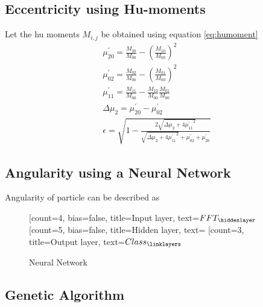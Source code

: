 \documentclass[11pt,fleqn,,a4paper,twoside,openright]{book}
\begin{document}
\subsection{Eccentricity using Hu-moments} \label{HuMoments}

\begin{sBox}
	Let the hu moments $ M_{i,j} $ be obtained using equation \ref{eq:humoment}
	\begin{equation}\label{eq:eccentricty}
	\begin{array}{ll}
	\mu_{20}^{\prime} =\frac{M_{20}}{M_{00}} - \left(\frac{M_{10}}{M_{00}}\right)^2 \\[0.3cm]
	\mu_{02}^{\prime} =\frac{M_{02}}{M_{00}} - \left(\frac{M_{01}}{M_{00}}\right)^2 \\[0.3cm]
	\mu_{11}^{\prime} =\frac{M_{11}}{M_{00}} - \frac{M_{10}}{M_{00}} \frac{M_{01}}{M_{00}} \\[0.3cm]
	\Delta \mu_2 = \mu_{20}^{\prime} - \mu_{02}^{\prime} \\[0.3cm]
	\epsilon = \sqrt{1 - \frac{2 \sqrt{\Delta \mu_2 + 4 {\mu_{11}^{\prime}}^2}}{\sqrt{\Delta \mu_2 + 4 {\mu_{11}^{\prime}}^2} + \mu_{02}^{\prime} + \mu_{20}^{\prime}}}
	\end{array} 
	\end{equation}
\end{sBox}

\subsection{Angularity using a Neural Network} \label{NeuralNet}
Angularity of particle can be described as 

\begin{figure}[h, center]
	\begin{center}
		\begin{neuralnetwork}[height=4, nodespacing=40]
			\newcommand{\nodetextclear}[2]{}
			\newcommand{\nodetextx}[2]{$FFT_#2$}
			\newcommand{\nodetexty}[2]{$Class_#2$}
			[count=4, bias=false, title=Input layer, text=\nodetextx]
			\hiddenlayer[count=5, bias=false, title=Hidden layer, text=\nodetextclear] \linklayers
			\outputlayer[count=3, title=Output layer, text=\nodetexty] \linklayers
		\end{neuralnetwork}
	\end{center}
	\caption{Neural Network}
\end{figure}


\subsection{Genetic Algorithm}
\end{document}
